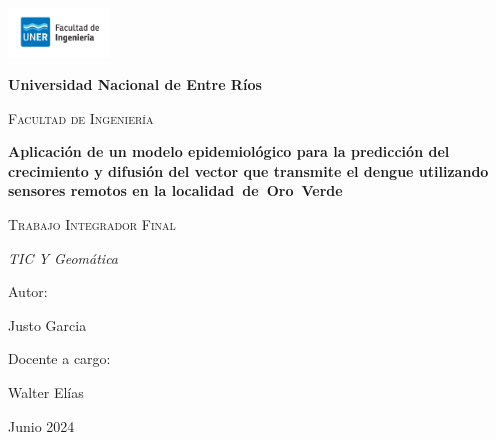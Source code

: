 \begin{titlepage}
    \centering
    {\includegraphics[width=0.2\textwidth]{Images/fiuner.png}\par}
    \vspace{0.01cm}
    {\bfseries\LARGE Universidad Nacional de Entre Ríos \par}
    \vspace{0.2cm}
    {\scshape\Large Facultad de Ingeniería \par}
    \vspace{1cm}
    {\bfseries\Huge Aplicación de un modelo epidemiológico para la predicción del crecimiento y difusión del vector que transmite el dengue utilizando sensores remotos en la localidad de Oro Verde \par}
    \vspace{2cm}
    {\scshape\Large Trabajo Integrador Final\par}
    {\itshape\Large TIC Y Geomática \par}
    \vfill
    { Autor: \par}
    {Justo Garcia \par}
    {Docente a cargo: \par}
    {Walter Elías \par}
    \vfill
    {\Large Junio 2024 \par}
\end{titlepage}
